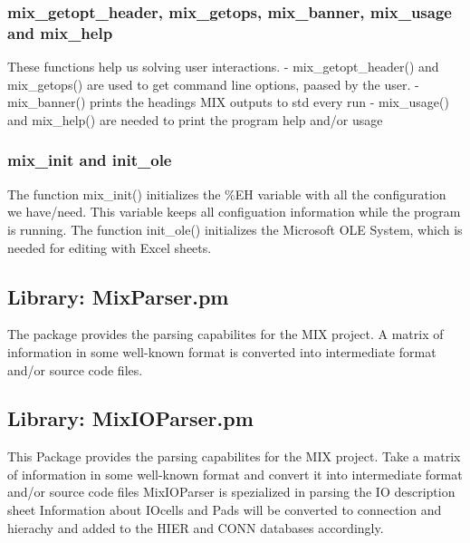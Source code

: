 \documentclass[a4paper,12pt]{article}
\begin{document}
\subsubsection{mix\_getopt\_header, mix\_getops, mix\_banner, mix\_usage and mix\_help}
These functions help us solving user interactions.\newline
\hspace*{10mm}- mix\_getopt\_header() and mix\_getops() are used to get command line options, paased by the user.
\hspace*{10mm}- mix\_banner() prints the headings MIX outputs to std every run
\hspace*{10mm}- mix\_usage() and mix\_help() are needed to print the program help and/or usage

\subsubsection{mix\_init and init\_ole}
The function mix\_init() initializes the \%EH variable with all the configuration we have/need. This variable keeps all configuation information while the program is running.\newline
The function init\_ole() initializes the Microsoft OLE System, which is needed for editing with Excel sheets.
\subsubsection{}

\subsection{Library: MixParser.pm}
The package provides the parsing capabilites for the MIX project. A matrix of information in some well-known format is converted into intermediate format and/or source code files.

\subsection{Library: MixIOParser.pm}
This Package provides the parsing capabilites for the MIX project. Take a matrix of information in some well-known format and convert it into intermediate format and/or source code files MixIOParser is spezialized in parsing the IO description sheet Information about IOcells and Pads will be converted to connection and hierachy and added to the HIER and CONN databases accordingly.
\end{document}

